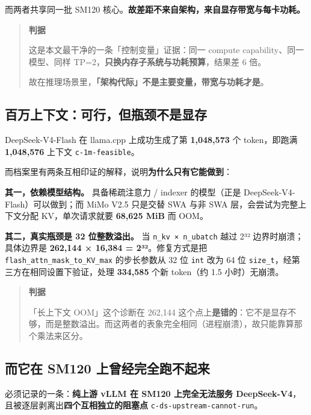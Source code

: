而两者共享同一批 SM120 核心。\textbf{故差距不来自架构，来自显存带宽与每卡功耗。}


\begin{quote}\small
\textbf{ 判据}

这是本文最干净的一条「控制变量」证据：同一 compute capability、同一模型、同样 TP=2，\textbf{只换内存子系统与功耗预算}，结果差 6 倍。

故在推理场景里，\textbf{「架构代际」不是主要变量，带宽与功耗才是}。

\end{quote}

\subsection{百万上下文：可行，但瓶颈不是显存}

DeepSeek-V4-Flash 在 llama.cpp 上成功生成了第 \textbf{1,048,573} 个 token，即跑满 \textbf{1,048,576} 上下文 {\scriptsize\texttt{c-\hspace{0pt}1m-\hspace{0pt}feasible}}。


而档案里有两条互相印证的解释，说明\textbf{为什么只有它能做到}：


\textbf{其一，依赖模型结构。} 具备稀疏注意力 / indexer 的模型（正是 DeepSeek-V4-Flash）可以做到；而 MiMo V2.5 只是交替 SWA 与非 SWA 层，会尝试为完整上下文分配 KV，单次请求就要 \textbf{68,625 MiB} 而 OOM。


\textbf{其二，真实瓶颈是 32 位整数溢出。} 当 \texttt{n\_kv × n\_ubatch} 越过 2³² 边界时崩溃；具体边界是 \textbf{262,144 × 16,384 = 2³²}。修复方式是把 \texttt{flash\_attn\_mask\_to\_KV\_max} 的步长参数从 32 位 \texttt{int} 改为 64 位 \texttt{size\_t}，经第三方在相同设置下验证，处理 \textbf{334,585} 个新 token（约 1.5 小时）无崩溃。


\begin{quote}\small
\textbf{ 判据}

「长上下文 OOM」这个诊断在 262,144 这个点上\textbf{是错的}：它不是显存不够，而是整数溢出。而这两者的表象完全相同（进程崩溃），故只能靠算那个乘法来区分。

\end{quote}

\subsection{而它在 SM120 上曾经完全跑不起来}

必须记录的一条：\textbf{纯上游 vLLM 在 SM120 上完全无法服务 DeepSeek-V4}，且被逐层剥离出\textbf{四个互相独立的阻塞点} {\scriptsize\texttt{c-\hspace{0pt}ds-\hspace{0pt}upstream-\hspace{0pt}cannot-\hspace{0pt}run}}。


